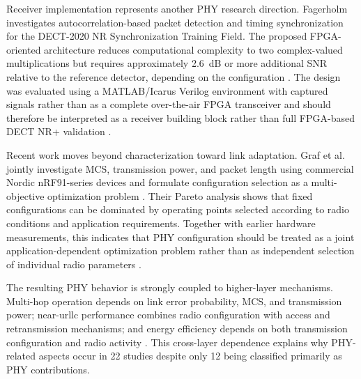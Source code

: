 Receiver implementation represents another PHY research direction. Fagerholm
investigates autocorrelation-based packet detection and timing synchronization
for the DECT-2020 NR Synchronization Training Field. The proposed
FPGA-oriented architecture reduces computational complexity to two
complex-valued multiplications but requires approximately 2.6~dB or more
additional SNR relative to the reference detector, depending on the
configuration
\cite{fagerholmFPGAbasedDECT2020New2024}. The design was evaluated using a
MATLAB/Icarus Verilog environment with captured signals rather than as a
complete over-the-air FPGA transceiver and should therefore be interpreted as
a receiver building block rather than full FPGA-based DECT NR+ validation
\cite{fagerholmFPGAbasedDECT2020New2024}.

Recent work moves beyond characterization toward link adaptation. Graf et al.
jointly investigate MCS, transmission power, and packet length using
commercial Nordic nRF91-series devices and formulate configuration selection
as a multi-objective optimization problem
\cite{grafParetoOptimalityApproach2026a}. Their Pareto analysis shows that
fixed configurations can be dominated by operating points selected according
to radio conditions and application requirements. Together with earlier
hardware measurements, this indicates that PHY configuration should be treated
as a joint application-dependent optimization problem rather than as
independent selection of individual radio parameters
\cite{bandaraExperimentalValidationAnalysis2025,
grafWhatExpectWhen2026,
grafParetoOptimalityApproach2026a}.

The resulting PHY behavior is strongly coupled to higher-layer mechanisms.
Multi-hop operation depends on link error probability, MCS, and transmission
power; near-\gls{urllc} performance combines radio configuration with access
and retransmission mechanisms; and energy efficiency depends on both
transmission configuration and radio activity
\cite{soniLinkLevelAssessmentNOMA2023,
samuylovEmpoweringNearURLLCIoT2025,
bandaraExperimentalValidationAnalysis2025,
grafParetoOptimalityApproach2026a}. This cross-layer dependence explains why
PHY-related aspects occur in 22 studies despite only 12 being classified
primarily as PHY contributions.

